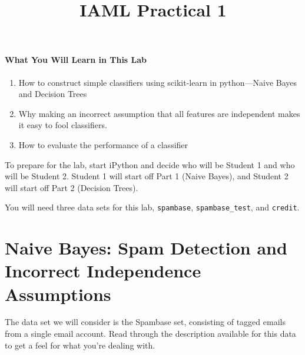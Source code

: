 \documentclass{article}
\begin{document}
\title{IAML Practical 1}

\maketitle

\paragraph{What You Will Learn in This Lab}

\begin{enumerate}
\item How to construct simple classifiers using scikit-learn in python---Naive Bayes and Decision Trees 
\item Why making an incorrect assumption that all features are independent makes it easy to fool classifiers. 
\item How to evaluate the performance of a classifier 
\end{enumerate} 

To prepare for the lab, start iPython and decide who will be Student 1 and who will be Student 2. Student 1 will start off Part 1 (Naive Bayes), and Student 2 will start off Part 2 (Decision Trees).

You will need three data sets for this lab, \texttt{spambase}, \texttt{spambase_test}, and \texttt{credit}.

\section{Naive Bayes: Spam Detection and Incorrect Independence Assumptions}

The data set we will consider is the Spambase set, consisting of tagged emails from a single email account. Read through the description available for this data to get a feel for what you're dealing with. 
\end{document}
